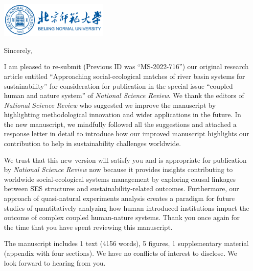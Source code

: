\documentclass[11pt,a4paper,roman]{moderncv}
\begin{document}
\begin{minipage}[t]{\textwidth}
\includegraphics[width=0.40\textwidth]{bnu}
\end{minipage}


\opening{\vspace*{-2em}}
\closing{Sincerely,}{\vspace*{-2em}}
\makelettertitle

I am pleased to re-submit (Previous ID was ``MS-2022-716'') our original research article entitled ``Approaching social-ecological matches of river basin systems for sustainability'' for consideration for publication in the special issue ``coupled human and nature system'' of \textit{National Science Review}. We thank the editors of \textit{National Science Review} who suggested we improve the manuscript by highlighting methodological innovation and wider applications in the future. In the new manuscript, we mindfully followed all the suggestions and attached a response letter in detail to introduce how our improved manuscript highlights our contribution to help in sustainability challenges worldwide.

We trust that this new version will satisfy you and is appropriate for publication by \textit{National Science Review} now because it provides insights contributing to worldwide social-ecological systems management by exploring causal linkages between SES structures and sustainability-related outcomes. Furthermore, our approach of quasi-natural experiments analysis creates a paradigm for future studies of quantitatively analyzing how human-introduced institutions impact the outcome of complex coupled human-nature systems. Thank you once again for the time that you have spent reviewing this manuscript.

The manuscript includes 1 text (4156 words), 5 figures, 1 supplementary material (appendix with four sections). We have no conflicts of interest to disclose.
We look forward to hearing from you.
\end{document}
